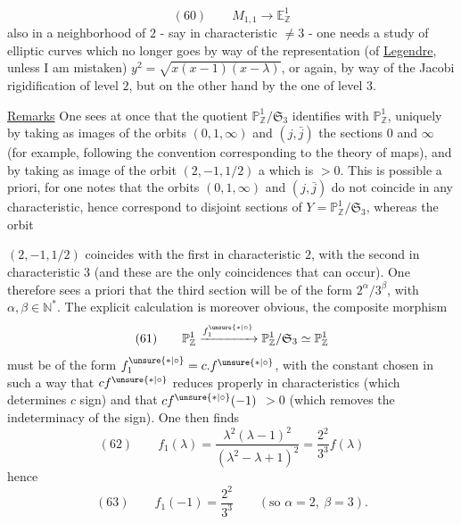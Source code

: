 
\[
(60)\qquad
M_{1,1}\longrightarrow\mathbb E^1_{\mathbb Z}
\]
also in a neighborhood of $2$ - say in characteristic $\ne 3$ - one needs a study
of elliptic curves which no longer goes by way of the representation
(of \uline{Legendre}, unless I am mistaken)
$y^{2}=\sqrt{x(x-1)(x-\lambda)}$, or again, by way of the Jacobi rigidification
of level $2$, but on the other hand by the one of level $3$.

\uline{Remarks} One sees at once that the quotient
$\mathbb P^1_{\mathbb Z}/\mathfrak S_3$ identifies with
$\mathbb P^1_{\mathbb Z}$, uniquely by taking as images of the
orbits $(0,1,\infty)$ and $(j,\bar j)$ the sections $0$ and $\infty$
(for example, following the convention corresponding to the theory of maps),
and by taking as image of the orbit $(2,-1,1/2)$ a
 which is $>0$.
This is possible a priori, for one notes that the 
orbits $(0,1,\infty)$ and $(j,\bar j)$
do not coincide in any characteristic, hence correspond to
disjoint sections of $Y=\mathbb P^1_{\mathbb Z}/\mathfrak S_3$,
whereas the  orbit


$(2,-1,1/2)$ coincides with the first in characteristic $2$, with the second in
characteristic $3$ (and these are the only coincidences that can occur).
One therefore sees a priori that the third section will be of the form
$2^\alpha/3^\beta$, with $\alpha,\beta\in\mathbb N^*$.
The explicit calculation is moreover obvious, the composite morphism
\[
(61)\qquad
\mathbb P^1_{\mathbb Z}
\xrightarrow{f_1^{\unsure{*|\circ}}}
\mathbb P^1_{\mathbb Z}/\mathfrak S_3
\simeq\mathbb P^1_{\mathbb Z}
\]
must be of the form
$f_1^{\unsure{*|\circ}}=c.f^{\unsure{*|\circ}}$, with the constant
 chosen in such a way that
$cf^{\unsure{*|\circ}}$  reduces properly in
 characteristics (which determines $c$  sign)
and that
$cf^{\unsure{*|\circ}}(-1)$  $>0$
(which removes the indeterminacy of the sign).
One then finds
\[
(62)\qquad
f_1(\lambda)=
\frac{\lambda^2(\lambda-1)^2}{(\lambda^2-\lambda+1)^{2}}
=\frac{2^2}{3^3}f(\lambda)
\]
hence
\[
(63)\qquad
f_1(-1)=\frac{2^2}{3^3}
\qquad(\text{so }\alpha=2,\ \beta=3).
\]

